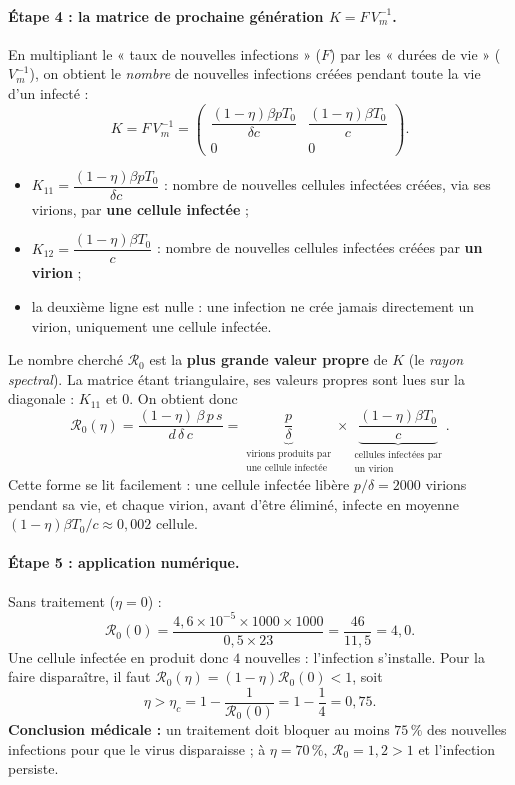 \documentclass[11pt,a4paper]{report}
\theoremstyle{plain}
\theoremstyle{definition}
\theoremstyle{remark}
\newcommand{\Rzero}{\mathcal{R}_0}
\begin{document}
\paragraph{Étape 4 : la matrice de prochaine génération $K=F\,V_m^{-1}$.} En multipliant le « taux de nouvelles infections » ($F$) par les « durées de vie » ($V_m^{-1}$), on obtient le \emph{nombre} de nouvelles infections créées pendant toute la vie d'un infecté :
$$K=F\,V_m^{-1}=\begin{pmatrix}\dfrac{(1-\eta)\beta pT_0}{\delta c}&\dfrac{(1-\eta)\beta T_0}{c}\\[10pt]0&0\end{pmatrix}.$$
\begin{itemize}
    \item $K_{11}=\dfrac{(1-\eta)\beta pT_0}{\delta c}$ : nombre de nouvelles cellules infectées créées, via ses virions, par \textbf{une cellule infectée} ;
    \item $K_{12}=\dfrac{(1-\eta)\beta T_0}{c}$ : nombre de nouvelles cellules infectées créées par \textbf{un virion} ;
    \item la deuxième ligne est nulle : une infection ne crée jamais directement un virion, uniquement une cellule infectée.
\end{itemize}
Le nombre cherché $\Rzero$ est la \textbf{plus grande valeur propre} de $K$ (le \emph{rayon spectral}). La matrice étant triangulaire, ses valeurs propres sont lues sur la diagonale : $K_{11}$ et $0$. On obtient donc
\begin{equation}
\Rzero(\eta)=\frac{(1-\eta)\,\beta\, p\, s}{d\,\delta\,c}
=\underbrace{\frac{p}{\delta}}_{\substack{\text{virions produits par}\\\text{une cellule infectée}}}\times
\underbrace{\frac{(1-\eta)\beta T_0}{c}}_{\substack{\text{cellules infectées par}\\\text{un virion}}}.
\label{eq:formule_r0}
\end{equation}
Cette forme se lit facilement : une cellule infectée libère $p/\delta=2000$ virions pendant sa vie, et chaque virion, avant d'être éliminé, infecte en moyenne $(1-\eta)\beta T_0/c\approx0{,}002$ cellule.

\paragraph{Étape 5 : application numérique.} Sans traitement ($\eta=0$) :
$$\Rzero(0)=\frac{4{,}6\times10^{-5}\times1000\times1000}{0{,}5\times23}=\frac{46}{11{,}5}=4{,}0 .$$
Une cellule infectée en produit donc $4$ nouvelles : l'infection s'installe. Pour la faire disparaître, il faut $\Rzero(\eta)=(1-\eta)\Rzero(0)<1$, soit
$$\eta>\eta_c=1-\frac1{\Rzero(0)}=1-\frac14=0{,}75 .$$
\textbf{Conclusion médicale :} un traitement doit bloquer au moins $75\,\%$ des nouvelles infections pour que le virus disparaisse ; à $\eta=70\,\%$, $\Rzero=1{,}2>1$ et l'infection persiste.
\end{document}
